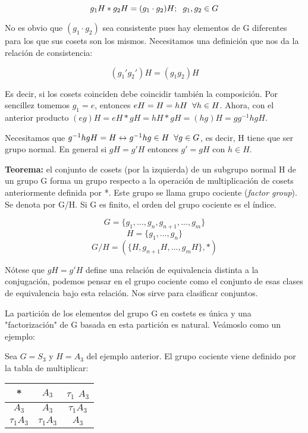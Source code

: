 $$g_1H*g_2H=(g_1\cdot g_2)H; \hspace{0.2cm} g_1,g_2 \in G$$

No es obvio que $(g_1\cdot g_2)$ sea consistente pues hay elementos de G diferentes para los que sus cosets son los mismos. Necesitamos una definición que nos da la relación de consistencia:

$$(g_1'g_2')H=(g_1g_2)H$$

Es decir, si los cosets coinciden debe coincidir también la composición. Por sencillez tomemos $g_1=e$, entonces $eH=H=hH \hspace{0.2cm} \forall h\in H$. Ahora, con el anterior producto $(eg)H=eH*gH=hH*gH=(hg)H=gg^{-1}hgH$.

\smallskip
Necesitamos que $g^{-1}hgH=H \leftrightarrow g^{-1}hg\in H \hspace{0.2cm} \forall g \in G$, es decir, H tiene que ser grupo normal. En general si $gH=g'H$ entonces $g'=gH$ con $h\in H$.

\smallskip
\textbf{Teorema:} el conjunto de cosets (por la izquierda) de un subgrupo normal H de un grupo G forma un grupo respecto a la operación de multiplicación de cosets anteriormente definida por *. Este grupo se llama grupo cociente (\textit{factor group}). Se denota por G/H. Si G es finito, el orden del grupo cociente es el índice.

$$G=\lbrace g_1,...,g_n,g_{n+1},...,g_m\rbrace$$
$$H=\lbrace g_1,...,g_n\rbrace$$
$$G/H=\left (\lbrace H,g_{n+1}H,...,g_mH\rbrace,*\right )$$

Nótese que $gH=g'H$ define una relación de equivalencia distinta a la conjugación, podemos pensar en el grupo cociente como el conjunto de esas clases de equivalencia bajo esta relación. Nos sirve para clasificar conjuntos.

La partición de los elementos del grupo G en costets es única y una "factorización" de G basada en esta partición es natural. Veámoslo como un ejemplo:

\smallskip
Sea $G=S_3$ y $H=A_3$ del ejemplo anterior. El grupo cociente viene definido por la tabla de multiplicar:
\begin{center}
\begin{tabular}[b]{ c | c c}
* & $A_3$ & $\tau _1$ $A_3$\\
\hline
$A_3$ & $A_3$ & $\tau _1 A_3$ \\

$\tau _1 A_3$ & $\tau _1 A_3$ & $A_3$
\end{tabular}

\end{center}


